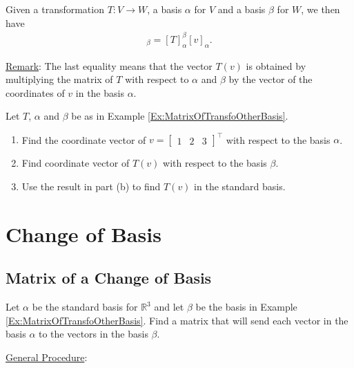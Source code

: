 \documentclass[12pt,a4paper]{article}
\newcounter{example}[section]
\begin{document}
	Given a transformation $T : V \rightarrow W$, a basis $\alpha$ for $V$ and a basis $\beta$ for $W$, we then have
		\begin{align*}
		[T(v)]_{\beta} = [T]_{\alpha}^\beta [v]_\alpha .
		\end{align*}
		
	\underline{Remark}: The last equality means that the vector $T(v)$ is obtained by multiplying the matrix of $T$ with respect to $\alpha$ and $\beta$ by the vector of the coordinates of $v$ in the basis $\alpha$.
	
	\vspace*{12pt}
	
	\begin{example}
	Let $T$, $\alpha$ and $\beta$ be as in Example \ref{Ex:MatrixOfTransfoOtherBasis}. 
		\begin{enumerate}
		\item Find the coordinate vector of $v = \begin{bmatrix} 1 & 2 & 3 \end{bmatrix}^\top$ with respect to the basis $\alpha$.
		\item Find coordinate vector of $T(v)$ with respect to the basis $\beta$.
		\item Use the result in part (b) to find $T(v)$ in the standard basis.
		\end{enumerate}
	\end{example}
	
	\newpage
	
	\section{Change of Basis}
	
	\subsection{Matrix of a Change of Basis}
	
	\begin{example}\label{Ex:ChangeBasis}
	Let $\alpha$ be the standard basis for $\mathbb{R}^3$ and let $\beta$ be the basis in Example \ref{Ex:MatrixOfTransfoOtherBasis}. Find a matrix that will send each vector in the basis $\alpha$ to the vectors in the basis $\beta$. 
	\end{example}
	
	\newpage
	
	\underline{General Procedure}:
	
\end{document}
